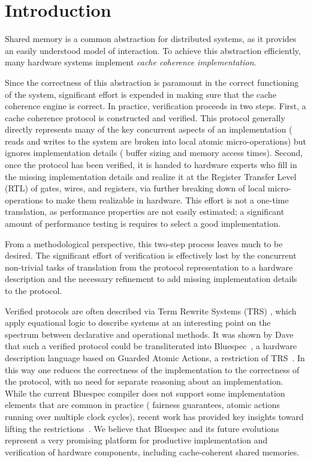 \section{Introduction}
\label{sec:Introduction}

Shared memory is a common abstraction for distributed systems, as it
provides an easily understood model of interaction. To achieve this
abstraction efficiently, many hardware systems implement \emph{cache
coherence implementation}.

Since the correctness of this abstraction is paramount in the correct
functioning of the system, significant effort is expended in making sure that
the cache coherence engine is correct. In practice, verification proceeds
in two steps. First, a cache coherence protocol is constructed and
verified. This protocol generally directly represents many of
the key concurrent aspects of an implementation (\eg{} reads and
writes to the system are broken into local atomic micro-operations) but
ignores implementation details (\eg{} buffer sizing and memory access
times). Second, once the protocol has been verified, it is handed to
hardware experts who fill in the missing implementation details and
realize it at the Register Transfer Level (RTL) of gates, wires, and
registers, via further breaking down of local micro-operations to
make them realizable in hardware. This effort is not a one-time translation, as
performance properties are not easily estimated; a significant amount of
performance testing is requires to select a good implementation. 

From a methodological perspective, this two-step process leaves much
to be desired. The significant effort of
verification is effectively lost by the concurrent non-trivial tasks
of translation from the protocol representation to a hardware
description and the necessary refinement to add missing implementation
details to the protocol. 

Verified protocols are often described via Term Rewrite
Systems (TRS) , which apply equational logic to describe systems at an
interesting point on the spectrum between declarative and operational methods.
It was shown by Dave
\etal{}~\cite{DNA:CoherenceImplementation} that such a verified
protocol could be transliterated into Bluespec~\cite{Bluespec:TFRG}, a
hardware description language based on Guarded Atomic Actions, a
restriction of TRS~\cite{Hoe:TCAD}. In this way one reduces the correctness of
the implementation to the correctness of the protocol, with no need
for separate reasoning about an implementation. While the current Bluespec compiler
does not support some implementation elements that are common in practice
(\eg{} fairness guarantees, atomic actions running over multiple clock cycles),
recent work has provided key insights toward lifting the
restrictions~\cite{DNA:CoherenceImplementation, Karczmarek}.  We
believe that Bluespec and its future evolutions represent a
very promising platform for productive implementation and
verification of hardware components, including cache-coherent
shared memories.

